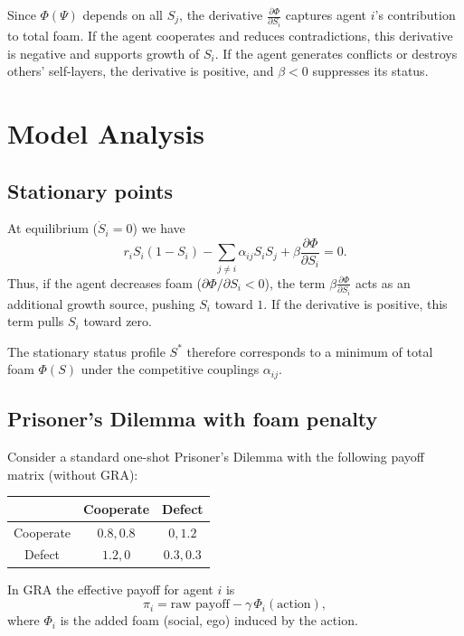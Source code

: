 \documentclass[11pt,a4paper]{article}
\begin{document}
Since $\Phi(\Psi)$ depends on all $S_j$, the derivative $\frac{\partial\Phi}{\partial S_i}$ captures agent $i$'s contribution to total foam.
If the agent cooperates and reduces contradictions, this derivative is negative and supports growth of $S_i$.
If the agent generates conflicts or destroys others' self-layers, the derivative is positive, and $\beta<0$ suppresses its status.

\section{Model Analysis}

\subsection{Stationary points}

At equilibrium ($\dot S_i=0$) we have
\begin{equation}
r_i S_i(1-S_i) - \sum_{j\neq i}\alpha_{ij} S_i S_j + \beta\frac{\partial\Phi}{\partial S_i} = 0.
\end{equation}
Thus, if the agent decreases foam ($\partial\Phi/\partial S_i < 0$), the term $\beta\frac{\partial\Phi}{\partial S_i}$ acts as an additional growth source, pushing $S_i$ toward $1$.
If the derivative is positive, this term pulls $S_i$ toward zero.

The stationary status profile $S^*$ therefore corresponds to a minimum of total foam $\Phi(S)$ under the competitive couplings $\alpha_{ij}$.

\subsection{Prisoner's Dilemma with foam penalty}

Consider a standard one-shot Prisoner's Dilemma with the following payoff matrix (without GRA):

\begin{center}
\begin{tabular}{c|cc}
 & Cooperate & Defect \\
\hline
Cooperate & $0.8, 0.8$ & $0, 1.2$ \\
Defect    & $1.2, 0$   & $0.3, 0.3$ \\
\end{tabular}
\end{center}

In GRA the effective payoff for agent $i$ is
\begin{equation}
\pi_i = \text{raw payoff} - \gamma\,\Phi_i(\text{action}),
\end{equation}
where $\Phi_i$ is the added foam (social, ego) induced by the action.
\end{document}
